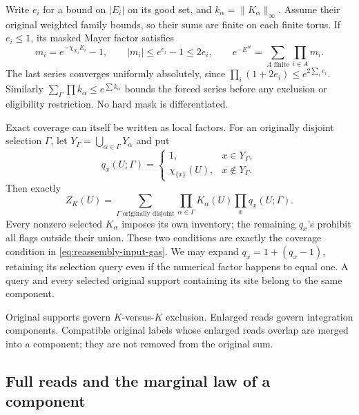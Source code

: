 \documentclass[11pt,reqno]{amsart}
\numberwithin{equation}{section}
\theoremstyle{definition}
\theoremstyle{remark}
\begin{document}
Write \(e_i\) for a bound on \(|E_i|\) on its good set,
and \(k_\alpha=\|K_\alpha\|_\infty\). Assume their original
weighted family bounds, so their sums are finite on each finite
torus. If \(e_i\le1\), its masked Mayer factor satisfies
\begin{equation}
 m_i=e^{-\chi_{X_i}E_i}-1,\qquad |m_i|\le e^{e_i}-1\le2e_i,
 \qquad e^{-E^\#}=\sum_{A\text{ finite}}\prod_{i\in A}m_i.
 \label{eq:reassembly-incoming-Mayer}
\end{equation}
The last series converges uniformly absolutely, since
\(\prod_i(1+2e_i)\le e^{2\sum_i e_i}\).
Similarly \(\sum_\Gamma\prod k_\alpha\le e^{\sum k_\alpha}\)
bounds the forced series before any exclusion or eligibility
restriction. No hard mask is differentiated.

Exact coverage can itself be written as local factors. For an
originally disjoint selection \(\Gamma\), let
\(Y_\Gamma=\bigcup_{\alpha\in\Gamma}Y_\alpha\) and put
\[
 q_x(U;\Gamma)=
 \begin{cases}1,&x\in Y_\Gamma,\\
               \chi_{\{x\}}(U),&x\notin Y_\Gamma.
 \end{cases}
\]
Then exactly
\begin{equation}
 Z_K(U)=\sum_{\Gamma\text{ originally disjoint}}
       \prod_{\alpha\in\Gamma}K_\alpha(U)\prod_x q_x(U;\Gamma).
 \label{eq:reassembly-local-prohibition}
\end{equation}
Every nonzero selected \(K_\alpha\) imposes its own inventory;
the remaining \(q_x\)'s prohibit all flags outside their union.
These two conditions are exactly the coverage condition in
\eqref{eq:reassembly-input-gas}. We may expand
\(q_x=1+(q_x-1)\), retaining its selection query even if the
numerical factor happens to equal one. A query and every selected
original support containing its site belong to the same component.

Original supports govern \(K\)-versus-\(K\) exclusion.
Enlarged reads govern integration components. Compatible original
labels whose enlarged reads overlap are merged into a component;
they are not removed from the original sum.

\subsection{Full reads and the marginal law of a component}
\end{document}
